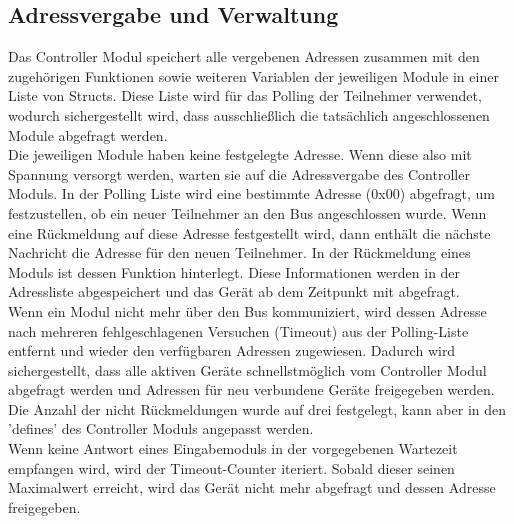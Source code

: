 \subsection{Adressvergabe und Verwaltung}
Das Controller Modul speichert alle vergebenen Adressen zusammen mit den zugehörigen Funktionen sowie weiteren Variablen der jeweiligen Module in einer Liste von Structs. Diese Liste wird für das Polling der Teilnehmer verwendet, wodurch sichergestellt wird, dass ausschließlich die tatsächlich angeschlossenen Module abgefragt werden.\\





Die jeweiligen Module haben keine festgelegte Adresse. Wenn diese also mit Spannung versorgt werden, warten sie auf die Adressvergabe des Controller Moduls. In der Polling Liste wird eine bestimmte Adresse (0x00) abgefragt, um festzustellen, ob ein neuer Teilnehmer an den Bus angeschlossen wurde. Wenn eine Rückmeldung auf diese Adresse festgestellt wird, dann enthält die nächste Nachricht die Adresse für den neuen Teilnehmer. In der Rückmeldung eines Moduls ist dessen Funktion hinterlegt. Diese Informationen werden in der Adressliste abgespeichert und das Gerät ab dem Zeitpunkt mit abgefragt.\\



Wenn ein Modul nicht mehr über den Bus kommuniziert, wird dessen Adresse nach mehreren fehlgeschlagenen Versuchen (Timeout) aus der Polling-Liste entfernt und wieder den verfügbaren Adressen zugewiesen. Dadurch wird sichergestellt, dass alle aktiven Geräte schnellstmöglich vom Controller Modul abgefragt werden und Adressen für neu verbundene Geräte freigegeben werden. Die Anzahl der nicht Rückmeldungen wurde auf drei festgelegt, kann aber in den 'defines' des Controller Moduls angepasst werden.
\\



Wenn keine Antwort eines Eingabemoduls in der vorgegebenen Wartezeit empfangen wird, wird der Timeout-Counter iteriert. Sobald dieser seinen Maximalwert erreicht, wird das Gerät nicht mehr abgefragt und dessen Adresse freigegeben.


